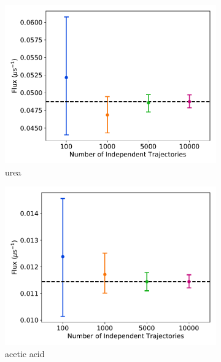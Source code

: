 \documentclass{article}
\begin{document}
  \begin{figure}
  \centering
  \begin{subfigure}{0.45\textwidth}
  \includegraphics[width=\textwidth]{flux_curves_Nsensitivity_URE.pdf}
  \caption{urea}\label{fig:Nsensitivity_URE}
  \end{subfigure}
  \begin{subfigure}{0.45\textwidth}
  \includegraphics[width=\textwidth]{flux_curves_Nsensitivity_ACH.pdf}
  \caption{acetic acid}\label{fig:Nsensitivity_ACH}
  \end{subfigure}
  \begin{subfigure}{0.45\textwidth}

\end{subfigure}
\end{figure}
\end{document}
